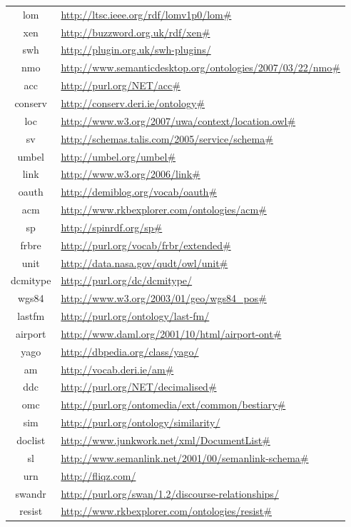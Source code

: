 \documentclass{article}
\begin{document}
\begin{longtable}{ c | p{8cm} }
lom & \url{http://ltsc.ieee.org/rdf/lomv1p0/lom#} \\
xen & \url{http://buzzword.org.uk/rdf/xen#} \\
swh & \url{http://plugin.org.uk/swh-plugins/} \\
nmo & \url{http://www.semanticdesktop.org/ontologies/2007/03/22/nmo#} \\
acc & \url{http://purl.org/NET/acc#} \\
conserv & \url{http://conserv.deri.ie/ontology#} \\
loc & \url{http://www.w3.org/2007/uwa/context/location.owl#} \\
sv & \url{http://schemas.talis.com/2005/service/schema#} \\
umbel & \url{http://umbel.org/umbel#} \\
link & \url{http://www.w3.org/2006/link#} \\
oauth & \url{http://demiblog.org/vocab/oauth#} \\
acm & \url{http://www.rkbexplorer.com/ontologies/acm#} \\
sp & \url{http://spinrdf.org/sp#} \\
frbre & \url{http://purl.org/vocab/frbr/extended#} \\
unit & \url{http://data.nasa.gov/qudt/owl/unit#} \\
dcmitype & \url{http://purl.org/dc/dcmitype/} \\
wgs84 & \url{http://www.w3.org/2003/01/geo/wgs84_pos#} \\
lastfm & \url{http://purl.org/ontology/last-fm/} \\
airport & \url{http://www.daml.org/2001/10/html/airport-ont#} \\
yago & \url{http://dbpedia.org/class/yago/} \\
am & \url{http://vocab.deri.ie/am#} \\
ddc & \url{http://purl.org/NET/decimalised#} \\
omc & \url{http://purl.org/ontomedia/ext/common/bestiary#} \\
sim & \url{http://purl.org/ontology/similarity/} \\
doclist & \url{http://www.junkwork.net/xml/DocumentList#} \\
sl & \url{http://www.semanlink.net/2001/00/semanlink-schema#} \\
urn & \url{http://fliqz.com/} \\
swandr & \url{http://purl.org/swan/1.2/discourse-relationships/} \\
resist & \url{http://www.rkbexplorer.com/ontologies/resist#} \\

\end{longtable}
\end{document}
